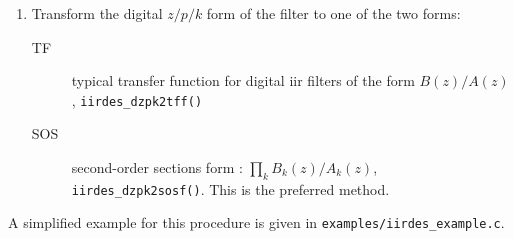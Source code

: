 \begin{enumerate}
\item Transform the digital $z/p/k$ form of the filter to one of the two forms:
    \begin{description}
    \item[TF]  typical transfer function for digital iir filters of the form
        $B(z)/A(z)$, {\tt iirdes\_dzpk2tff()}
    \item[SOS] second-order sections form : $\prod_k{ B_k(z)/A_k(z) }$, 
        {\tt iirdes\_dzpk2sosf()}.
        This is the preferred method.
    \end{description}


\end{enumerate}
%
A simplified example for this procedure is given in
{\tt examples/iirdes\_example.c}.

